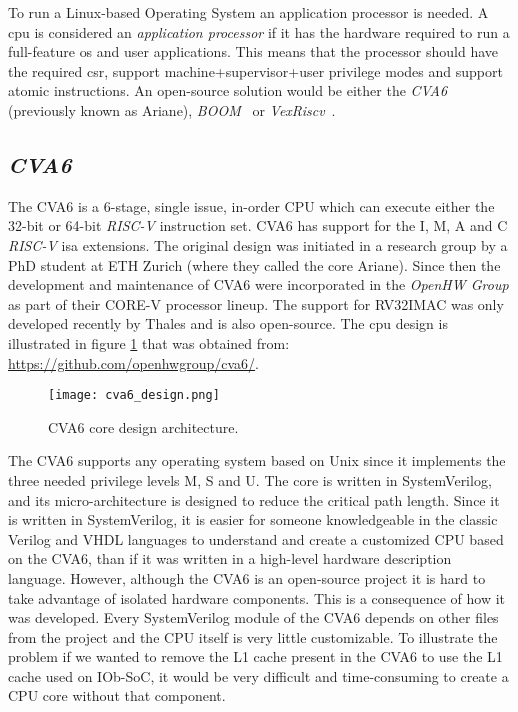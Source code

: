 To run a Linux-based Operating System an application processor is needed. A \acrshort{cpu} is considered an \textit{application processor} if it has the hardware required to run a full-feature \acrfull{os} and user applications. This means that the processor should have the required \acrfull{csr}, support \acrshort{machine}+\acrshort{supervisor}+\acrshort{user} privilege modes and support atomic instructions. An open-source solution would be either the \textit{CVA6}~\cite{zaruba2019cost} (previously known as Ariane), \textit{BOOM}~\cite{zhaosonicboom} or \textit{VexRiscv}~\cite{vexriscv}.

\subsection{\textit{CVA6}}
The CVA6 is a 6-stage, single issue, in-order CPU which can execute either the 32-bit or 64-bit \textit{RISC-V} instruction set. CVA6 has support for the I, M, A and C \textit{RISC-V} \acrshort{isa} extensions. The original design was initiated in a research group by a PhD student at ETH Zurich (where they called the core Ariane). Since then the development and maintenance of CVA6 were incorporated in the \textit{OpenHW Group} as part of their CORE-V processor lineup. The support for RV32IMAC was only developed recently by Thales and is also open-source. The \acrshort{cpu} design is illustrated in figure \ref{fig:cva6_design} that was obtained from: \url{https://github.com/openhwgroup/cva6/}.

\begin{figure}[!h]
    \centering
    \texttt{[image: cva6\_design.png]}
    \caption{CVA6 core design architecture.}
    \label{fig:cva6_design}
\end{figure}

The CVA6 supports any operating system based on Unix since it implements the three needed privilege levels M, S and U. The core is written in SystemVerilog, and its micro-architecture is designed to reduce the critical path length. Since it is written in SystemVerilog, it is easier for someone knowledgeable in the classic Verilog and VHDL languages to understand and create a customized CPU based on the CVA6, than if it was written in a high-level hardware description language. However, although the CVA6 is an open-source project it is hard to take advantage of isolated hardware components. This is a consequence of how it was developed. Every SystemVerilog module of the CVA6 depends on other files from the project and the CPU itself is very little customizable. To illustrate the problem if we wanted to remove the L1 cache present in the CVA6 to use the L1 cache used on IOb-SoC, it would be very difficult and time-consuming to create a CPU core without that component.

